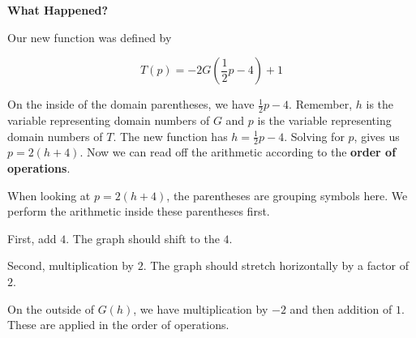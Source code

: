 \documentclass{ximera}
\begin{document}
\begin{example}
\begin{image}
\end{image}






\textbf{What Happened?} 


Our new function was defined by 

\[
T(p) = -2G\left( \frac{1}{2} p - 4 \right) + 1
\]






On the inside of the domain parentheses, we have $\frac{1}{2} p - 4$.  Remember, $h$ is the variable representing domain numbers of $G$ and $p$ is the variable representing domain numbers of $T$. The new function has $h = \frac{1}{2} p - 4$. Solving for $p$, gives us $p = 2(h+4)$.  Now we can read off the arithmetic according to the \textbf{order of operations}.  




When looking at $p = 2(h+4)$, the parentheses are grouping symbols here.  We perform the arithmetic inside these parentheses first. 

First, add $4$. The graph should shift to the  $4$. 

Second, multiplication by $2$. The graph should stretch horizontally by a factor of $2$.




On the outside of $G(h)$, we have multiplication by $-2$ and then addition of $1$.  These are applied in the order of operations. 


\end{example}
\end{document}
